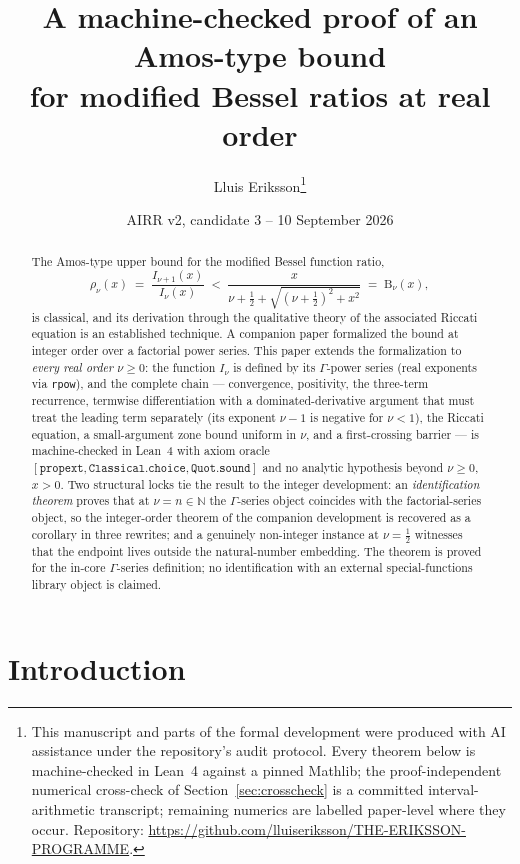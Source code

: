 \documentclass[11pt]{article}
\title{A machine-checked proof of an Amos-type bound\\
for modified Bessel ratios at real order}
\author{Lluis Eriksson\thanks{This manuscript and parts of the formal
development were produced with AI assistance under the repository's
audit protocol.  Every theorem below is machine-checked in Lean~4
against a pinned Mathlib; the proof-independent numerical cross-check of
Section~\ref{sec:crosscheck} is a committed interval-arithmetic
transcript; remaining numerics are labelled paper-level where they
occur.  Repository:
\url{https://github.com/lluiseriksson/THE-ERIKSSON-PROGRAMME}.}}
\date{AIRR v2, candidate 3 -- 10 September 2026}
\newcommand{\lean}[1]{\texttt{#1}}
\newcommand{\RHS}{\mathrm{B}}
\begin{document}
\maketitle

\begin{abstract}
The Amos-type upper bound for the modified Bessel function ratio,
\[
\rho_\nu(x) \;=\; \frac{I_{\nu+1}(x)}{I_\nu(x)}
\;<\;
\frac{x}{\nu+\tfrac12+\sqrt{(\nu+\tfrac12)^2+x^2}} \;=\; \RHS_\nu(x),
\]
is classical, and its derivation through the qualitative theory of
the associated Riccati equation is an established technique.  A
companion paper formalized the bound at integer order over a
factorial power series.  This paper extends the formalization to
\emph{every real order $\nu \ge 0$}: the function $I_\nu$ is defined
by its $\Gamma$-power series (real exponents via \lean{rpow}), and
the complete chain --- convergence, positivity, the three-term
recurrence, termwise differentiation with a dominated-derivative
argument that must treat the leading term separately (its exponent
$\nu-1$ is negative for $\nu < 1$), the Riccati equation, a
small-argument zone bound uniform in $\nu$, and a first-crossing
barrier --- is machine-checked in Lean~4 with axiom oracle
$[\lean{propext}, \lean{Classical.choice}, \lean{Quot.sound}]$ and
no analytic hypothesis beyond $\nu \ge 0$, $x > 0$.  Two structural
locks tie the result to the integer development: an
\emph{identification theorem} proves that at $\nu = n \in \mathbb{N}$
the $\Gamma$-series object coincides with the factorial-series
object, so the integer-order theorem of the companion development is
recovered as a corollary in three rewrites; and a genuinely
non-integer instance at $\nu = \tfrac12$ witnesses that the endpoint
lives outside the natural-number embedding.  The theorem is proved
for the in-core $\Gamma$-series definition; no identification with
an external special-functions library object is claimed.
\end{abstract}

\section{Introduction}
\end{document}
